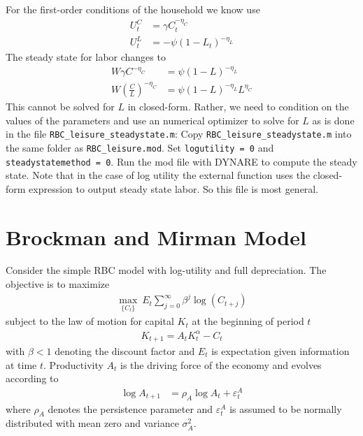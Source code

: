 \documentclass[a4paper]{scrartcl}
\begin{document}
\begin{enumerate}
	\begin{solution}
	For the first-order conditions of the household we know use
	\begin{align*}
	U_t^C &= \gamma C_t^{-\eta_C}\\
	U_t^L &= - \psi (1-L_t)^{-\eta_L}
	\end{align*}
	The steady state for labor changes to
	\begin{align*}
		W \gamma C^{-\eta_C} &= \psi(1-L)^{-\eta_L}\\
		W  \left(\frac{C}{L}\right)^{-\eta_C} &= \psi(1-L)^{-\eta_L}L^{\eta_C}
	\end{align*}
	This cannot be solved for $L$ in closed-form. Rather, we need to condition on the values of the parameters and use an numerical optimizer to solve for $L$ as is done in the file \texttt{RBC\_leisure\_steadystate.m}:
	Copy \texttt{RBC\_leisure\_steadystate.m} into the same folder as \texttt{RBC\_leisure.mod}. Set \texttt{logutility = 0} and \texttt{steadystatemethod = 0}. Run the mod file with DYNARE to compute the steady state. Note that in the case of log utility the external function uses the closed-form expression to output steady state labor. So this file is most general.
	\end{solution}
	\end{enumerate} 
\newpage
\section{Brockman and Mirman Model}
Consider the simple RBC model with log-utility and full depreciation. The objective is to maximize
\begin{align*}
\underset{\{C_{t}\}}{\max}~E_t \sum_{j=0}^{\infty} \beta^{j} \log(C_{t+j})
\end{align*}
subject to the law of motion for capital $K_t$ at the beginning of period $t$
\begin{align*}
K_{t+1} = A_tK_t^\alpha - C_t
\end{align*}
with $\beta <1$ denoting the discount factor and $E_t$ is expectation given information at time $t$. Productivity $A_t$ is the driving force of the economy and evolves according to
\begin{align*}
\log{A_{t+1}} &= \rho_A \log{A_t}  + \varepsilon_t^A
\end{align*}
where $\rho_A$ denotes the persistence parameter and $\varepsilon_t^A$ is assumed to be normally distributed with mean zero and variance $\sigma_A^2$.
\end{document}
